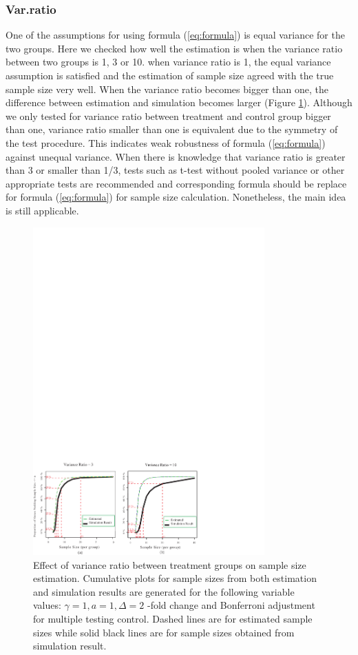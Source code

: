 \documentclass{bioinfo}
\begin{document}
\subsubsection{Var.ratio}

One of the assumptions for using formula (\ref{eq:formula}) is
equal variance for the two groups. Here we checked how well the
estimation is when the variance ratio between two groups is 1, 3
or 10. when variance ratio is 1, the equal variance assumption is
satisfied and the estimation of sample size agreed with the true
sample size very well. When the variance ratio becomes bigger than
one, the difference between estimation and simulation becomes
larger (Figure \ref{fig:ResVar}). Although we only tested for
variance ratio between treatment and control group bigger than
one, variance ratio smaller than one is equivalent due to the
symmetry of the test procedure. This indicates weak robustness of
formula (\ref{eq:formula}) against unequal variance. When there is
knowledge that variance ratio is greater than 3 or smaller than
1/3,  tests such as t-test without pooled variance or other
appropriate tests are recommended and corresponding formula should
be replace for formula (\ref{eq:formula}) for sample size
calculation. Nonetheless, the main idea is still applicable.

\begin{figure}[h]
  \centerline{\includegraphics*[width=3.5in]{ResVarF.pdf}}
  \caption[Effect of variance ratio between treatment groups on sample size estimation]
  {Effect of variance ratio between treatment groups on sample size estimation.
    Cumulative plots for sample sizes from both estimation and simulation
    results are generated for the following variable values: $\gamma = 1, a = 1, \Delta = 2$ -fold change
    and Bonferroni adjustment for multiple testing control. Dashed lines are for estimated sample sizes
    while solid black lines are for sample sizes obtained from simulation result.}
  \label{fig:ResVar}
\end{figure}
\end{document}
